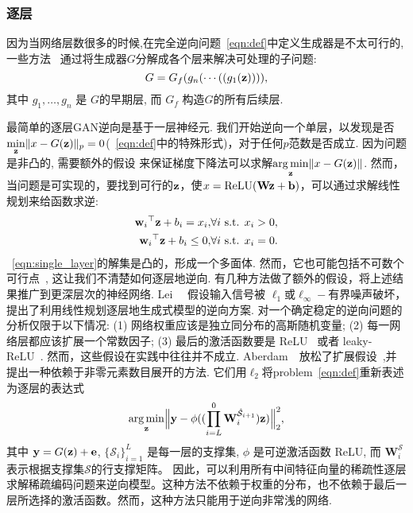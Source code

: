 \figindomain

\subsubsection{逐层}
\label{sec:layerwise}

因为当网络层数很多的时候,在完全逆向问题~\eqref{eqn:def}中定义生成器是不太可行的,一些方法~\cite{bau2019seeing,lei2019inverting,aberdam2020invert} 通过将生成器$G$分解成各个层来解决可处理的子问题:
\begin{equation}
G=G_{f}(g_{n}(\cdots((g_{1}(\mathbf{z})))),
\end{equation}
其中 $g_{1}, \ldots, g_{n}$ 是 $G$的早期层, 而 $G_{f}$ 构造$G$的所有后续层.

最简单的逐层GAN逆向是基于一层神经元. 
我们开始逆向一个单层，以发现是否$\underset{\mathbf{z}}\min\|x-G(\mathbf{z}) \|_p=0$(~\eqref{eqn:def}中的特殊形式)，对于任何$p$范数是否成立. 
因为问题是非凸的, 需要额外的假设 \cite{huang2018provably} 来保证梯度下降法可以求解$\underset{\mathbf{z}}{\arg\min}\|x-G(\mathbf{z})\|$.
然而，当问题是可实现的，要找到可行的$\mathbf{z}$，使$x= \text{ReLU}(\mathbf{W}\mathbf{z}+\mathbf{b})$，可以通过求解线性规划来给函数求逆:
\begin{eqnarray}
{\w_i}^\top \z + b_i = x_i, &\forall i \text{ s.t. } x_i>0, \nonumber\\
{\w_i}^\top \z + b_i\leq 0, &\forall i \text{ s.t. } x_i= 0.
\label{eqn:single_layer}
\end{eqnarray}
~\eqref{eqn:single_layer}的解集是凸的，形成一个多面体.
然而，它也可能包括不可数个可行点~\cite{lei2019inverting}, 这让我们不清楚如何逐层地逆向.
有几种方法做了额外的假设，将上述结果推广到更深层次的神经网络. 
Lei~\etal~\cite{lei2019inverting} 假设输入信号被 $\ell_1$或$\ell_{\infty}-$有界噪声破坏，提出了利用线性规划逐层地生成式模型的逆向方案. 
对一个确定稳定的逆向问题的分析仅限于以下情况: 
(1) 网络权重应该是独立同分布的高斯随机变量; 
(2) 每一网络层都应该扩展一个常数因子; 
(3) 最后的激活函数要是 ReLU~\cite{nair2010rectified} 或者 leaky-ReLU~\cite{maas2013rectifier}.
然而，这些假设在实践中往往并不成立. 
Aberdam~\etal~\cite{aberdam2020invert}放松了扩展假设~\cite{lei2019inverting},并提出一种依赖于非零元素数目展开的方法. 
它们用$\ell_2$将problem~\eqref{eqn:def}重新表述为逐层的表达式
\begin{equation}
\underset{\mathbf{z}}{\arg\min} \Bigl\|\mathbf{y} - \phi((\prod_{i=L}^{0} \mathbf{W}_i^{\hat{\mathcal{S}}_{i+1}})\mathbf{z})\Bigr\|_2^2,
\end{equation}
其中 $\mathbf{y}=G(\mathbf{z})+\mathbf{e}$, $\{\mathcal{S}_i\}_{i=1}^L$ 是每一层的支撑集, $\phi$ 是可逆激活函数 ReLU, 而 $\mathbf{W}_i^{\mathcal{S}}$ 表示根据支撑集$\mathcal{S}$的行支撑矩阵。
因此，可以利用所有中间特征向量的稀疏性逐层求解稀疏编码问题来逆向模型。这种方法不依赖于权重的分布，也不依赖于最后一层所选择的激活函数。然而，这种方法只能用于逆向非常浅的网络.

